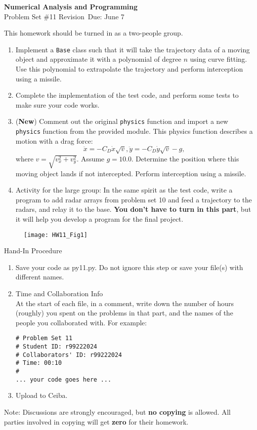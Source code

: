 \documentclass[12pt]{article}
\begin{document}
\begin{center}
\Large
\textbf{Numerical Analysis and Programming}\\
\large
Problem Set \#11 Revision\
Due: June 7
\end{center}
This homework should be turned in as  a two-people group.
\begin{enumerate}
\item Implement a \verb!Base! class such that it will take the trajectory data of a moving object and approximate it with a polynomial of degree $n$ using curve fitting. Use this polynomial to extrapolate the trajectory and perform interception using a missile. 

\item Complete the implementation of the test code, and perform some tests to make sure your code works. 
\item (\textbf{New}) Comment out the original \verb!physics! function and  import a  new \verb!physics! function from the provided module. This physics function describes a motion with a drag force:
\[
\ddot{x}=-C_D \dot{x}\sqrt{v}, \ddot{y}=-C_D \dot{y}\sqrt{v}-g,
\]
where $v=\sqrt{v_x^2+v_y^2}$. Assume $g=10.0$. Determine the position where this moving object lands if not intercepted. Perform interception using a missile. 


\item  Activity for the large group: In the same spirit as the test code, write a program to add radar arrays from problem set 10 and feed a trajectory  to the radars, and relay it to the base. \textbf{You don't have to turn in this part}, but it will help you develop a  program for the final project.  
\end{enumerate}

\begin{figure}[th]
\begin{center}
\texttt{[image: HW11\_Fig1]}
\end{center}
\end{figure}

Hand-In Procedure  
\begin{enumerate}
\item Save your code as py11.py.
 Do not ignore this step or save your file(s) with different names. 
\item Time and Collaboration Info \\
At the start of each file, in a comment, write down the number of hours (roughly) you spent on 
the problems in that part, and the names of the people you collaborated with. For example:
\begin{verbatim}
# Problem Set 11
# Student ID: r99222024
# Collaborators' ID: r99222024
# Time: 00:10
# 
... your code goes here ...
\end{verbatim}
\item Upload to Ceiba.
\end{enumerate}
Note: Discussions are strongly encouraged, but \textbf{no copying} is allowed. All parties involved in copying will get \textbf{zero} for their homework. 
\end{document}
